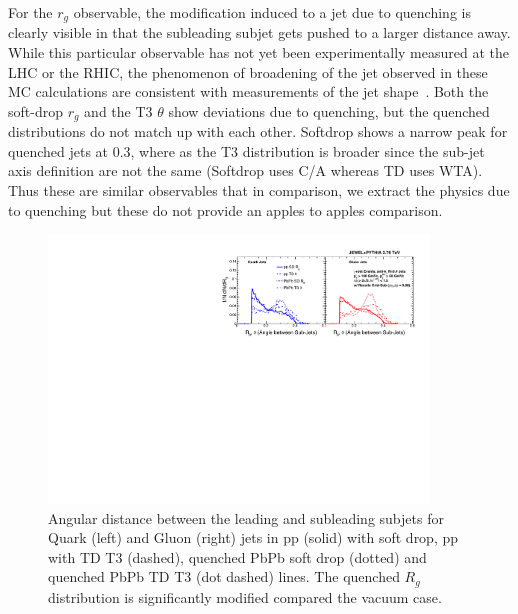 \documentclass[notoc]{JHEP3}
\begin{document}
For the $r_g$ observable, the modification induced to a jet due to quenching is clearly visible in that the subleading subjet gets pushed to a larger distance away. While this particular observable has not yet been experimentally measured at the LHC or the RHIC, the phenomenon of broadening of the jet observed in these MC calculations are consistent with measurements of the jet shape~\cite{}. Both the soft-drop $r_g$ and the T3 $\theta$ show deviations due to quenching, but the quenched distributions do not match up with each other. Softdrop shows a narrow peak for quenched jets at 0.3, where as the T3 distribution is broader since the sub-jet axis definition are not the same (Softdrop uses C/A whereas TD uses WTA). Thus these are similar observables that in comparison, we extract the physics due to quenching but these do not provide an apples to apples comparison.

\begin{figure}[t]
	   \centering
	   \includegraphics[width=0.9\textwidth]{plots/Comp_rg.pdf}
	   \caption{Angular distance between the leading and subleading subjets for Quark (left) and Gluon (right) jets in pp (solid) with soft drop, pp with TD T3 (dashed), quenched PbPb soft drop (dotted) and quenched PbPb TD T3 (dot dashed) lines. The quenched $R_{g}$ distribution is significantly modified compared the vacuum case.}
\label{fig:comp_rg}
\end{figure}
\end{document}
